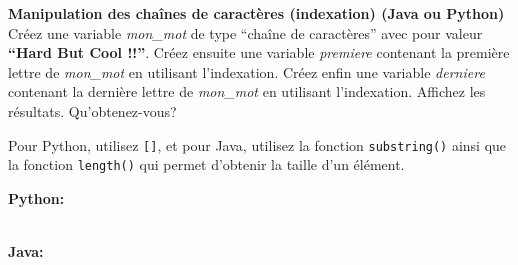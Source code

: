 \begin{Exercice}[5 minutes] \textbf{Manipulation des chaînes de caractères (indexation) (Java ou Python)}\\
    Créez une variable \textit{mon\_mot} de type ``chaîne de caractères'' avec pour valeur \textbf{``Hard But Cool !!''}. Créez ensuite une variable \textit{premiere} contenant la première lettre de \textit{mon\_mot} en utilisant l'indexation. Créez enfin une variable \textit{derniere} contenant la dernière lettre de \textit{mon\_mot} en utilisant l'indexation. Affichez les résultats. Qu'obtenez-vous? \\
    
     \begin{conseil}
           Pour Python, utilisez \lstinline{[]}, et pour Java, utilisez la fonction \lstinline{substring()} ainsi que la fonction \lstinline{length()} qui permet d'obtenir la taille d'un élément.
         
     \end{conseil}
     \begin{solution}
     
     \textbf{Python:}
     
     
     \textbf{\\Java:}
     
            
     \end{solution}   
 \end{Exercice}
